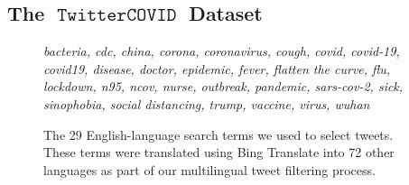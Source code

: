 \documentclass[11pt]{article}
\DeclareMathOperator{\corona}{\texttt{TwitterCOVID}}
\begin{document}
\subsection{The $\corona$ Dataset}

\begin{figure}
    \footnotesize
    \emph{%
    bacteria,
    cdc,
    china,
    corona,
    coronavirus,
    cough,
    covid,
    covid-19,
    covid19,
    disease,
    doctor,
    epidemic,
    fever,
    flatten the curve,
    flu,
    lockdown,
    n95,
    ncov,
    nurse,
    outbreak,
    pandemic,
    sars-cov-2,
    sick,
    sinophobia,
    social distancing,
    trump,
    vaccine,
    virus,
    wuhan
}
    \caption{
        The 29 English-language search terms we used to select tweets.
        These terms were translated using Bing Translate into 72 other languages as part of our multilingual tweet filtering process.
    }
    \label{fig:terms}
\end{figure}
\end{document}
